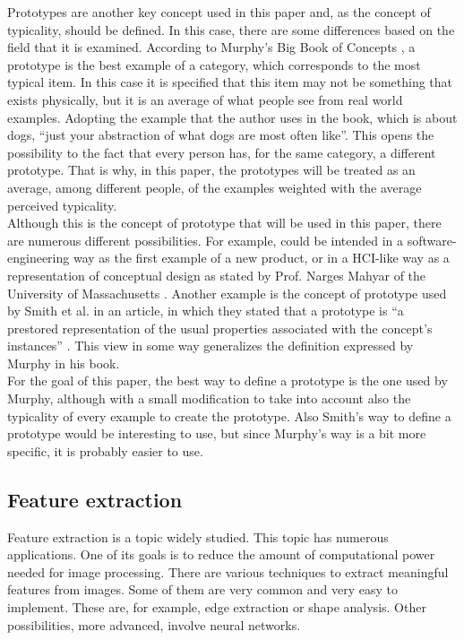 \documentclass[conference]{IEEEtran}
\begin{document}
			\noindent Prototypes are another key concept used in this paper and, as the concept of typicality, should be defined. In this case, there are some differences based on the field that it is 
			examined. According to Murphy's Big Book of Concepts \cite{Murphy:2002}, a prototype is the best example of a category, which corresponds to the most typical item. In this case 
			it is specified that this item may not be something that exists physically, but it is an average of what people see from real world examples. Adopting the example that the 
			author uses in the book, which is about dogs, ``just your abstraction of what dogs are most often like''. This opens the possibility to the fact that every person has, for the 
			same category, a different prototype. That is why, in this paper, the prototypes will be treated as an average, among different people, of the examples weighted with the 
			average perceived typicality.\\
			Although this is the concept of prototype that will be used in this paper, there are numerous different possibilities. For example, could be intended in a software-engineering way 
			as the first example of a new product, or in a HCI-like way as a representation of conceptual design as stated by Prof. Narges Mahyar of the University of 
			Massachusetts \cite{hciprot}. Another example is the concept of prototype used by Smith et al. in an article, in which they stated that a prototype is ``a prestored representation 
			of the usual properties associated with the concept's instances'' \cite{smith1988combining}. This view in some way generalizes the definition expressed by Murphy in his book. \\
			For the goal of this paper, the best way to define a prototype is the one used by Murphy, although with a small modification to take into account also the typicality of every 
			example to create the prototype. Also Smith's way to define a prototype would be interesting to use, but since Murphy's way is a bit more specific, it is probably easier to use.

		\subsection{Feature extraction\label{sec:bfe}}

			\noindent Feature extraction is a topic widely studied. 
			This topic has numerous applications. 
			One of its goals is to reduce the amount of computational power needed for image processing. 
			There are various techniques to extract meaningful features from images. 
			Some of them are very common and very easy to implement. 
			These are, for example, edge extraction or shape analysis. 
			Other possibilities, more advanced, involve neural networks.\\
\end{document}

